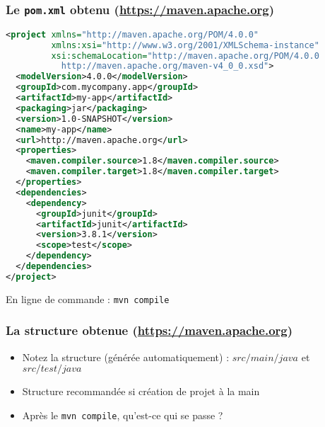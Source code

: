 \documentclass{beamer}
\begin{document}
\begin{frame}[fragile]
  \frametitle{Le \texttt{pom.xml} obtenu {\normalsize (\url{https://maven.apache.org})}}
\begin{lstlisting}[language=XML,basicstyle=\tiny]
<project xmlns="http://maven.apache.org/POM/4.0.0"
         xmlns:xsi="http://www.w3.org/2001/XMLSchema-instance"
         xsi:schemaLocation="http://maven.apache.org/POM/4.0.0
           http://maven.apache.org/maven-v4_0_0.xsd">
  <modelVersion>4.0.0</modelVersion>
  <groupId>com.mycompany.app</groupId>
  <artifactId>my-app</artifactId>
  <packaging>jar</packaging>
  <version>1.0-SNAPSHOT</version>
  <name>my-app</name>
  <url>http://maven.apache.org</url>
  <properties>
    <maven.compiler.source>1.8</maven.compiler.source>
    <maven.compiler.target>1.8</maven.compiler.target>
  </properties>
  <dependencies>
    <dependency>
      <groupId>junit</groupId>
      <artifactId>junit</artifactId>
      <version>3.8.1</version>
      <scope>test</scope>
    </dependency>
  </dependencies>
</project>
\end{lstlisting}
En ligne de commande : \texttt{mvn compile}
\end{frame}

\begin{frame}[fragile]
  \frametitle{La structure obtenue {\normalsize(\url{https://maven.apache.org})}}
  \begin{itemize}
    \vspace{4cm}
  \item Notez la structure (générée automatiquement) : $src/main/java$
    et $src/test/java$
  \item Structure recommandée si création de projet à la main    
  \item Après le \texttt{mvn compile}, qu'est-ce qui se passe ?

\end{itemize}  
\end{frame}
\end{document}
